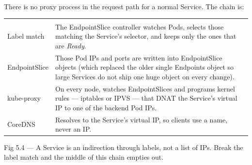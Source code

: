  There is no proxy process in the request path for a normal  Service. The chain is:

\begin{center}\small
\wbrowcolors
\begin{tabularx}{\linewidth}{@{}L{34mm} X@{}}
 & \\
Label match & The EndpointSlice controller watches Pods, selects those matching the Service's selector, and keeps only the ones that are \emph{Ready}.\\
EndpointSlice & Those Pod IPs and ports are written into EndpointSlice objects (which replaced the older single Endpoints object so large Services do not ship one huge object on every change).\\
kube-proxy & On every node,  watches EndpointSlices and programs kernel rules --- iptables or IPVS --- that DNAT the Service's virtual IP to one of the backend Pod IPs.\\
CoreDNS & Resolves  to the Service's virtual IP, so clients use a name, never an IP.\\
\end{tabularx}
\end{center}

\begin{wbfigure}{Fig 5.4 — A Service is an indirection through labels, not a list of IPs. Break the label match and the middle of this chain empties out.}
\end{wbfigure}

